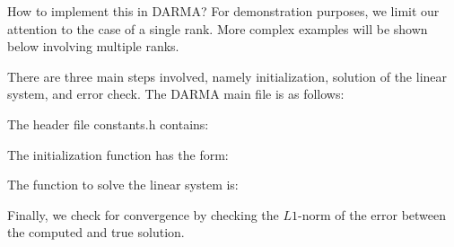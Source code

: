 How to implement this in DARMA? 
For demonstration purposes, we limit our attention to the case 
of a single rank. More complex examples will be shown below 
involving multiple ranks.

There are three main steps involved, namely initialization, 
solution of the linear system, and error check. 
The DARMA main file is as follows:


The header file constants.h contains:


The initialization function has the form:


The function to solve the linear system is:


Finally, we check for convergence by checking the $L1$-norm of the 
error between the computed and true solution.








